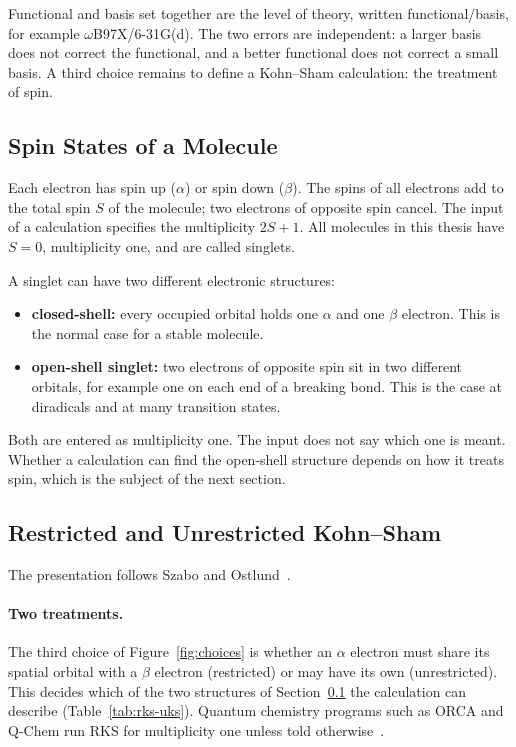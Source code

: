 Functional and basis set together are the level of theory, written
functional/basis, for example \mbox{$\omega$B97X/6-31G(d)}. The two
errors are independent: a larger basis does not correct the functional,
and a better functional does not correct a small basis. A third choice
remains to define a Kohn--Sham calculation: the treatment of spin.

\subsection{Spin States of a Molecule}
\label{sec:background-spinstates}

Each electron has spin up ($\alpha$) or spin down ($\beta$). The spins of
all electrons add to the total spin $S$ of the molecule; two electrons of
opposite spin cancel. The input of a calculation specifies the
multiplicity $2S + 1$. All molecules in this thesis have $S = 0$,
multiplicity one, and are called singlets.

A singlet can have two different electronic structures:

\begin{itemize}
  \item \textbf{closed-shell:} every occupied orbital holds one $\alpha$
    and one $\beta$ electron. This is the normal case for a stable
    molecule.
  \item \textbf{open-shell singlet:} two electrons of opposite spin sit in
    two different orbitals, for example one on each end of a breaking
    bond. This is the case at diradicals and at many transition states.
\end{itemize}

Both are entered as multiplicity one. The input does not say which one is
meant. Whether a calculation can find the open-shell structure depends on
how it treats spin, which is the subject of the next section.

\subsection{Restricted and Unrestricted Kohn--Sham}
\label{sec:background-spin}

The presentation follows Szabo and Ostlund~\cite{szabo1996}.

\paragraph{Two treatments.} The third choice of Figure~\ref{fig:choices}
is whether an $\alpha$ electron must share its spatial orbital with a
$\beta$ electron (restricted) or may have its own (unrestricted). This
decides which of the two structures of
Section~\ref{sec:background-spinstates} the calculation can describe
(Table~\ref{tab:rks-uks}). Quantum chemistry programs such as ORCA and
Q-Chem run RKS for multiplicity one unless told
otherwise~\cite{orca_manual, qchem_manual}.

